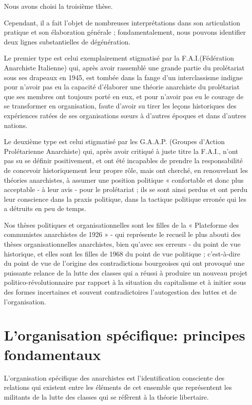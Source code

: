 Nous avons choisi la troisième thèse.

Cependant, il a fait l'objet de nombreuses interprétations dans son articulation pratique et son élaboration générale ; fondamentalement, nous pouvons identifier deux lignes substantielles de dégénération.

Le premier type est celui exemplairement stigmatisé par la F.A.I.(Fédération Anarchiste Italienne) qui, après avoir rassemblé une grande partie du prolétariat sous ses drapeaux en 1945, est tombée dans la fange d'un interclassisme indigne pour n'avoir pas eu la capacité d'élaborer une théorie anarchiste du prolétariat que ses membres ont toujours porté en eux, et pour n'avoir pas eu le courage de se transformer en organisation, faute d'avoir su tirer les leçons historiques des expériences ratées de ses organisations sœurs à d'autres époques et dans d'autres nations.

Le deuxième type est celui stigmatisé par les G.A.A.P. (Groupes d'Action Prolétarienne Anarchiste) qui, après avoir critiqué à juste titre la F.A.I., n'ont pas su se définir positivement, et ont été incapables de prendre la responsabilité de concevoir historiquement leur propre rôle, mais ont cherché, en renouvelant les théories anarchistes, à assumer une position politique « confortable et donc plus acceptable - à leur avis - pour le prolétariat ; ils se sont ainsi perdus et ont perdu leur conscience dans la praxis politique, dans la tactique politique erronée qui les a détruits en peu de temps.

Nos thèses politiques et organisationnelles sont les filles de la « Plateforme des communistes anarchistes de 1926 » - qui représente le recueil le plus abouti des thèses organisationnelles anarchistes, bien qu'avec ses erreurs - du point de vue historique, et elles sont les filles de 1968 du point de vue politique ; c'est-à-dire du point de vue de l'origine des contradictions bourgeoises qui ont provoqué une puissante relance de la lutte des classes qui a réussi à produire un nouveau projet politico-révolutionnaire par rapport à la situation du capitalisme et à initier sous des formes incertaines et souvent contradictoires l'autogestion des luttes et de l'organisation.

\chapter{L'organisation spécifique: principes fondamentaux}

L'organisation spécifique des anarchistes est l'identification consciente des relations qui existent entre les éléments de cet ensemble que représentent les militants de la lutte des classes qui se réfèrent à la théorie libertaire.

